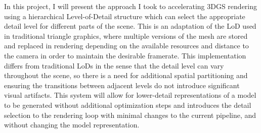 In this project, I will present the approach I took to accelerating 3DGS rendering using a hierarchical Level-of-Detail structure which can select the appropriate detail level for different parts of the scene. This is an adaptation of the LoD used in traditional triangle graphics, where multiple versions of the mesh are stored and replaced in rendering depending on the available resources and distance to the camera in order to maintain the desirable framerate. This implementation differs from traditional LoDs in the sense that the detail level can vary throughout the scene, so there is a need for additional spatial partitioning and ensuring the transitions between adjacent levels do not introduce significant visual artifacts. This system will allow for lower-detail representations of a model to be generated without additional optimization steps and introduces the detail selection to the rendering loop with minimal changes to the current pipeline, and without changing the model representation. 